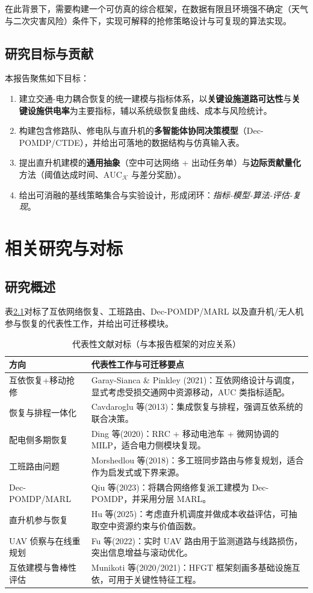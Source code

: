 \documentclass[UTF8,zihao=-4,a4paper,fontset=fandol]{ctexrep}
\begin{document}
在此背景下，需要构建一个可仿真的综合框架，在数据有限且环境强不确定（天气与二次灾害风险）条件下，实现可解释的抢修策略设计与可复现的算法实现。

\section{研究目标与贡献}
本报告聚焦如下目标：
\begin{enumerate}[leftmargin=2em]
  \item 建立交通-电力耦合恢复的统一建模与指标体系，以\textbf{关键设施道路可达性}与\textbf{关键设施供电率}为主要指标，辅以系统级恢复曲线、成本与风险统计。
  \item 构建包含修路队、修电队与直升机的\textbf{多智能体协同决策模型}（Dec-POMDP/CTDE），并给出可落地的数据结构与仿真输入表。
  \item 提出直升机建模的\textbf{通用抽象}（空中可达网络 + 出动任务单）与\textbf{边际贡献量化}方法（阈值达成时间、$\text{AUC}_{\mathcal{K}}$ 与差分奖励）。
  \item 给出可消融的基线策略集合与实验设计，形成闭环：\textit{指标-模型-算法-评估-复现}。
\end{enumerate}

\chapter{相关研究与对标}\label{ch:related}
\section{研究概述}
表\ref{tab:lit}对标了互依网络恢复、工班路由、Dec-POMDP/MARL 以及直升机/无人机参与恢复的代表性工作，并给出可迁移模块。

\begin{table}[H]
\centering
\caption{代表性文献对标（与本报告框架的对应关系）}
\label{tab:lit}
\begin{tabularx}{0.98\textwidth}{lX}
\toprule
\textbf{方向} & \textbf{代表性工作与可迁移要点}\\
\midrule
互依恢复+移动抢修 & Garay-Sianca \& Pinkley (2021)：互依网络设计与调度，显式考虑受损交通网中资源移动，AUC 类指标适配。\\
恢复与排程一体化 & Cavdaroglu 等(2013)：集成恢复与排程，强调互依系统的联合决策。\\
配电侧多期恢复 & Ding 等(2020)：RRC + 移动电池车 + 微网协调的 MILP，适合电力侧模块复现。\\
工班路由问题 & Morshedlou 等(2018)：多工班同步路由与修复规划，适合作为启发式或下界来源。\\
Dec-POMDP/MARL & Qiu 等(2023)：将耦合网络修复派工建模为 Dec-POMDP，并采用分层 MARL。\\
直升机参与恢复 & Hu 等(2025)：考虑直升机调度并做成本收益评估，可抽取空中资源约束与价值函数。\\
UAV 侦察与在线重规划 & Fu 等(2022)：实时 UAV 路由用于监测道路与线路损伤，突出信息增益与滚动优化。\\
互依建模与鲁棒性评估 & Munikoti 等(2020/2021)：HFGT 框架刻画多基础设施互依，可用于关键性特征工程。\\
\bottomrule
\end{tabularx}
\end{table}
\end{document}
